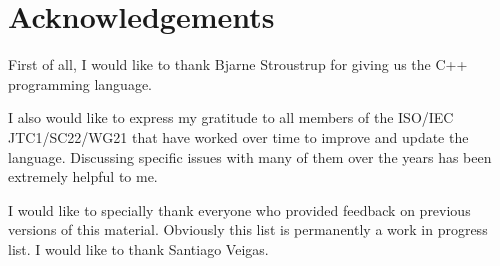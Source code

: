 \chapter*{Acknowledgements}

First of all, I would like to thank Bjarne Stroustrup for giving us 
the C++ programming language.

I also would like to express my gratitude to all members of the ISO/IEC
JTC1/SC22/WG21 that have worked over time to improve and update the language.
Discussing specific issues with many of them over the years has been extremely
helpful to me. 

I would like to specially thank everyone who provided feedback 
on previous versions of this material. 
Obviously this list is permanently a work in progress list. I would like to thank
Santiago Veigas.

